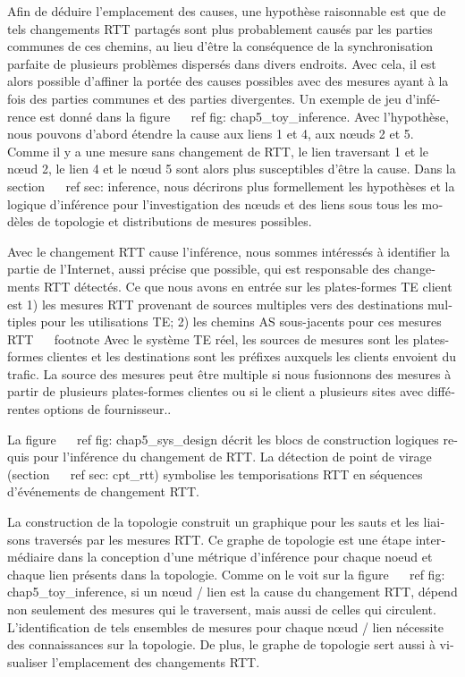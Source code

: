 \begin{otherlanguage}{french}
{{{Afin de déduire l'emplacement des causes, une hypothèse raisonnable est que de tels changements RTT partagés sont plus probablement causés par les parties communes de ces chemins, au lieu d'être la conséquence de la synchronisation parfaite de plusieurs problèmes dispersés dans divers endroits.
Avec cela, il est alors possible d'affiner la portée des causes possibles avec des mesures ayant à la fois des parties communes et des parties divergentes.
Un exemple de jeu d'inférence est donné dans la figure ~ \ ref {fig: chap5_toy_inference}.
Avec l'hypothèse, nous pouvons d'abord étendre la cause aux liens 1 et 4, aux nœuds 2 et 5.
Comme il y a une mesure sans changement de RTT, le lien traversant 1 et le nœud 2, le lien 4 et le nœud 5 sont alors plus susceptibles d'être la cause.
Dans la section ~ \ ref {sec: inference}, nous décrirons plus formellement les hypothèses et la logique d'inférence pour l'investigation des nœuds et des liens sous tous les modèles de topologie et distributions de mesures possibles.

Avec le changement RTT cause l'inférence, nous sommes intéressés à identifier la partie de l'Internet, aussi précise que possible, qui est responsable des changements RTT détectés.
Ce que nous avons en entrée sur les plates-formes TE client est 1) les mesures RTT provenant de sources multiples vers des destinations multiples pour les utilisations TE; 2) les chemins AS sous-jacents pour ces mesures RTT ~ \ footnote {Avec le système TE réel, les sources de mesures sont les plates-formes clientes et les destinations sont les préfixes auxquels les clients envoient du trafic.
La source des mesures peut être multiple si nous fusionnons des mesures à partir de plusieurs plates-formes clientes ou si le client a plusieurs sites avec différentes options de fournisseur.}.

La figure ~ \ ref {fig: chap5_sys_design} décrit les blocs de construction logiques requis pour l'inférence du changement de RTT. La détection de point de virage (section ~ \ ref {sec: cpt_rtt}) symbolise les temporisations RTT en séquences d'événements de changement RTT.

La construction de la topologie construit un graphique pour les sauts et les liaisons traversés par les mesures RTT.
Ce graphe de topologie est une étape intermédiaire dans la conception d'une métrique d'inférence pour chaque noeud et chaque lien présents dans la topologie. Comme on le voit sur la figure ~ \ ref {fig: chap5_toy_inference}, si un nœud / lien est la cause du changement RTT, dépend non seulement des mesures qui le traversent, mais aussi de celles qui circulent. L'identification de tels ensembles de mesures pour chaque nœud / lien nécessite des connaissances sur la topologie. De plus, le graphe de topologie sert aussi à visualiser l'emplacement des changements RTT.

}}}
\end{otherlanguage}

